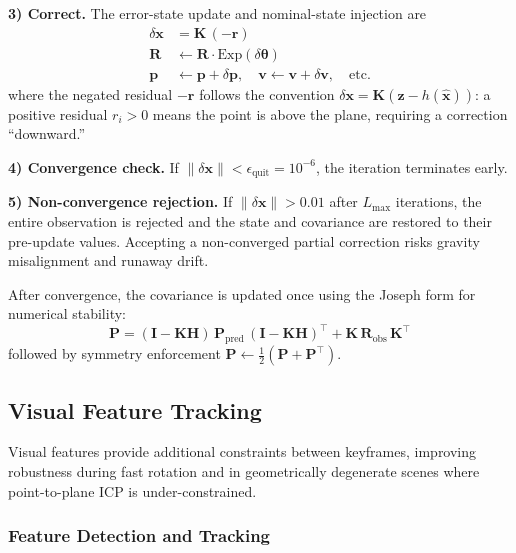 \textbf{3) Correct.}
The error-state update and nominal-state injection are
\begin{align}
    \delta\mathbf{x} &= \mathbf{K}\,(-\mathbf{r}) \label{eq:dx} \\
    \mathbf{R} &\leftarrow \mathbf{R} \cdot \mathrm{Exp}(\delta\boldsymbol{\theta}) \label{eq:rot_correct} \\
    \mathbf{p} &\leftarrow \mathbf{p} + \delta\mathbf{p}, \quad
    \mathbf{v} \leftarrow \mathbf{v} + \delta\mathbf{v}, \quad \text{etc.} \label{eq:state_correct}
\end{align}
where the negated residual $-\mathbf{r}$ follows the convention $\delta\mathbf{x} = \mathbf{K}(\mathbf{z} - h(\hat{\mathbf{x}}))$: a positive residual $r_i > 0$ means the point is above the plane, requiring a correction ``downward.''

\textbf{4) Convergence check.}
If $\|\delta\mathbf{x}\| < \epsilon_\text{quit} = 10^{-6}$, the iteration terminates early.

\textbf{5) Non-convergence rejection.}
If $\|\delta\mathbf{x}\| > 0.01$ after $L_\text{max}$ iterations, the entire observation is rejected and the state and covariance are restored to their pre-update values.
Accepting a non-converged partial correction risks gravity misalignment and runaway drift.

After convergence, the covariance is updated once using the Joseph form for numerical stability:
\begin{equation}
    \mathbf{P} = (\mathbf{I} - \mathbf{K}\mathbf{H})\,\mathbf{P}_\text{pred}\,(\mathbf{I} - \mathbf{K}\mathbf{H})^\top + \mathbf{K}\,\mathbf{R}_\text{obs}\,\mathbf{K}^\top
    \label{eq:joseph}
\end{equation}
followed by symmetry enforcement $\mathbf{P} \leftarrow \tfrac{1}{2}(\mathbf{P} + \mathbf{P}^\top)$.

\subsection{Visual Feature Tracking}
\label{sec:visual}

Visual features provide additional constraints between keyframes, improving robustness during fast rotation and in geometrically degenerate scenes where point-to-plane ICP is under-constrained.

\subsubsection{Feature Detection and Tracking}

